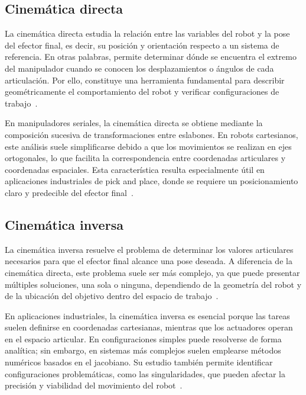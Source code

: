 \subsection{Cinemática directa}
La cinemática directa estudia la relación entre las variables del robot y la pose del efector final, es decir, su posición y orientación respecto a un sistema de referencia. En otras palabras, permite determinar dónde se encuentra el extremo del manipulador cuando se conocen los desplazamientos o ángulos de cada articulación. Por ello, constituye una herramienta fundamental para describir geométricamente el comportamiento del robot y verificar configuraciones de trabajo~\cite{murray1994robotic}.

En manipuladores seriales, la cinemática directa se obtiene mediante la composición sucesiva de transformaciones entre eslabones. En robots cartesianos, este análisis suele simplificarse debido a que los movimientos se realizan en ejes ortogonales, lo que facilita la correspondencia entre coordenadas articulares y coordenadas espaciales. Esta característica resulta especialmente útil en aplicaciones industriales de pick and place, donde se requiere un posicionamiento claro y predecible del efector final~\cite{siciliano2010robotics,lynch2017modern}.

\subsection{Cinemática inversa}
La cinemática inversa resuelve el problema de determinar los valores articulares necesarios para que el efector final alcance una pose deseada. A diferencia de la cinemática directa, este problema suele ser más complejo, ya que puede presentar múltiples soluciones, una sola o ninguna, dependiendo de la geometría del robot y de la ubicación del objetivo dentro del espacio de trabajo~\cite{lynch2017modern,murray1994robotic}.

En aplicaciones industriales, la cinemática inversa es esencial porque las tareas suelen definirse en coordenadas cartesianas, mientras que los actuadores operan en el espacio articular. En configuraciones simples puede resolverse de forma analítica; sin embargo, en sistemas más complejos suelen emplearse métodos numéricos basados en el jacobiano. Su estudio también permite identificar configuraciones problemáticas, como las singularidades, que pueden afectar la precisión y viabilidad del movimiento del robot~\cite{siciliano2010robotics,corke2017robotics}.



